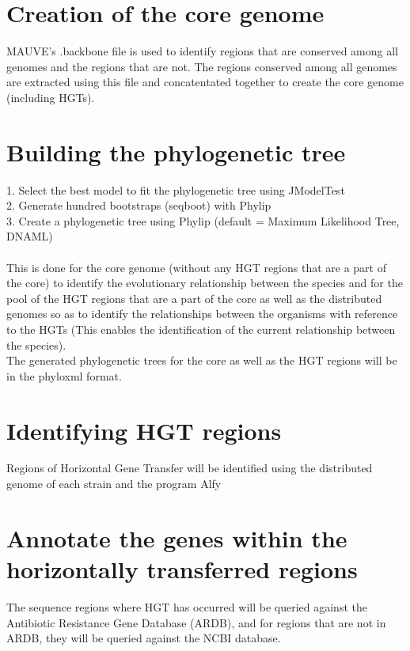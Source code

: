 \documentclass[11pt]{article}
\begin{document}
\section{Creation of the core genome}
MAUVE’s .backbone file is used to identify regions that are conserved among all genomes and the regions that are not. The regions conserved among all genomes are extracted using this file and concatentated together to create the core genome (including HGTs). \\

\section{Building the phylogenetic tree}
1. Select the best model to fit the phylogenetic tree using JModelTest \cite{jModelTest}\\
2. Generate hundred bootstraps (seqboot) with Phylip \cite{phylip} \\
3. Create a phylogenetic tree using Phylip (default = Maximum Likelihood Tree, DNAML)\\\\
This is done for the core genome (without any HGT regions that are a part
of the core) to identify the evolutionary relationship between the species
and for the pool of the HGT regions that are a part of the core as well as
the distributed genomes so as to identify the relationships between the
organisms with reference to the HGTs (This enables the identification of
the current relationship between the species).\\
The generated phylogenetic trees for the core as well as the HGT regions will be in the phyloxml format.\\

\section{Identifying HGT regions}
Regions of Horizontal Gene Transfer will be identified using the distributed genome of each strain and the program Alfy \cite{Alfy}

\section{Annotate the genes within the horizontally transferred regions}
The sequence regions where HGT has occurred will be queried against the Antibiotic Resistance Gene Database (ARDB),  and for regions that are not in ARDB, they will be queried against the NCBI database.\\
\end{document}
